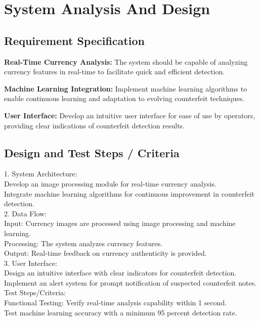 \documentclass[12pt]{article}
\begin{document}
 \section{System Analysis And Design}
 \subsection{Requirement Specification }
\textbf{Real-Time Currency Analysis:} The system should be capable of analyzing currency features in real-time to facilitate quick and efficient detection.

\textbf{Machine Learning Integration:} Implement machine learning algorithms to enable continuous learning and adaptation to evolving counterfeit techniques.

\textbf{User Interface:} Develop an intuitive user interface for ease of use by operators, providing clear indications of counterfeit detection results.
 \subsection{Design and Test Steps / Criteria}
1. System Architecture:\\[0.5mm]
Develop an image processing module for real-time currency analysis.\\[0.5mm]
Integrate machine learning algorithms for continuous improvement in counterfeit detection.\\[0.5mm]

2. Data Flow:\\[0.5mm]
Input: Currency images are processed using image processing and machine learning.\\[0.5mm]
Processing: The system analyzes currency features.\\[0.5mm]
Output: Real-time feedback on currency authenticity is provided.\\[0.5mm]

3. User Interface:\\[0.5mm]
Design an intuitive interface with clear indicators for counterfeit detection.\\[0.5mm]
Implement an alert system for prompt notification of suspected counterfeit notes.\\[0.5mm]

Test Steps/Criteria:\\[0.5mm]

Functional Testing:
Verify real-time analysis capability within 1 second.\\[0.5mm]
Test machine learning accuracy with a minimum 95 percent detection rate.\\[0.5mm]
\end{document}
